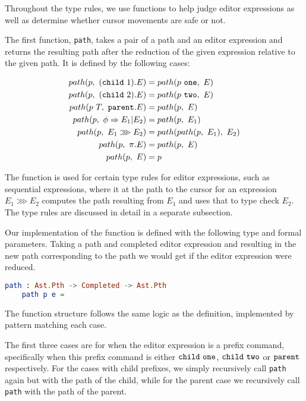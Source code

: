 Throughout the type rules, we use functions to help judge editor expressions as
well as determine whether cursor movements are safe or not.

The first function, \texttt{path}, takes a pair of a path and an editor
expression and returns the resulting path after the reduction of the given
expression relative to the given path. It is defined by the following cases:

\begin{align}
  path(p,~(\texttt{child}~1).E)           & = path(p~\mathtt{one},~E) \\
  path(p,~(\texttt{child}~2).E)           & = path(p~\mathtt{two},~E) \\
  path(p~T,~ \texttt{parent}.E)            & = path(p,~E)              \\
  path(p,~\phi \Rightarrow E_1|E_2) & = path(p,~E_1)            \\
  path(p,~E_1 \ggg E_2)            & = path(path(p,~E_1),~E_2)      \\
  path(p,~\pi.E)                   & = path(p,~E)              \\
  path(p,~E)                       & = p
\end{align}

The function is used for certain type rules for editor expressions, such as
sequential expressions, where it at the path to the cursor for an expression
$E_1 \ggg E_2$ computes the path resulting from $E_1$ and uses that to type
check $E_2$. The type rules are discussed in detail in a separate subsection.

Our implementation of the function is defined with the following type and
formal parameters. Taking a path and completed editor expression and resulting
in the new path corresponding to the path we would get if the editor expression
were reduced.

\begin{lstlisting}[language=elm,%
    gobble=4,%
    ]
    path : Ast.Pth -> Completed -> Ast.Pth
    path p e =
\end{lstlisting}

The function structure follows the same logic as the definition, implemented
by pattern matching each case.

The first three cases are for when the editor expression is a prefix command,
specifically when this prefix command is either $\texttt{child}~\texttt{one}$,
$\texttt{child}~\texttt{two}$ or $\texttt{parent}$ respectively. For the cases with child
prefixes, we simply recursively call \texttt{path} again but with the path of
the child, while for the parent case we recursively call \texttt{path} with the
path of the parent.

